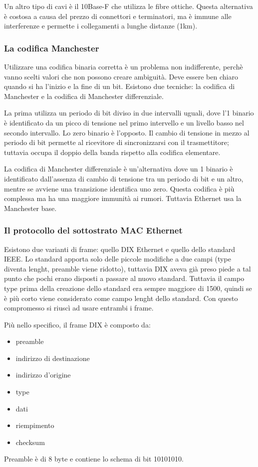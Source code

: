 Un altro tipo di cavi è il 10Base-F che utilizza le fibre ottiche.
Questa alternativa è costosa a causa del prezzo di connettori e terminatori, ma è immune alle interferenze e permette i collegamenti a lunghe distanze (1km).

\subsubsection{La codifica Manchester}
Utilizzare una codifica binaria corretta è un problema non indifferente, perchè vanno scelti valori che non possono creare ambiguità.
Deve essere ben chiaro quando si ha l'inizio e la fine di un bit.
Esistono due tecniche: la codifica di Manchester e la codifica di Manchester differenziale.

La prima utilizza un periodo di bit diviso in due intervalli uguali, dove l'1 binario è identificato da un picco di tensione nel primo intervello e un livello basso nel secondo intervallo.
Lo zero binario è l'opposto.
Il cambio di tensione in mezzo al periodo di bit permette al ricevitore di sincronizzarsi con il trasmettitore;
tuttavia occupa il doppio della banda rispetto alla codifica elementare.

La codifica di Manchester differenziale è un'alternativa dove un 1 binario è identificato dall'assenza di cambio di tensione tra un periodo di bit e un altro,
mentre se avviene una transizione identifica uno zero.
Questa codifica è più complessa ma ha una maggiore immunità ai rumori.
Tuttavia Ethernet usa la Manchester base.

\subsubsection{Il protocollo del sottostrato MAC Ethernet}
Esistono due varianti di frame: quello DIX Ethernet e quello dello standard IEEE.
Lo standard apporta solo delle piccole modifiche a due campi (type diventa lenght, preamble viene ridotto),
tuttavia DIX aveva già preso piede a tal punto che pochi erano disposti a passare al nuovo standard.
Tuttavia il campo type prima della creazione dello standard era sempre maggiore di 1500,
quindi se è più corto viene considerato come campo lenght dello standard.
Con questo compromesso si riuscì ad usare entrambi i frame.

Più nello specifico, il frame DIX è composto da:
\begin{itemize}
    \item preamble
    \item indirizzo di destinazione
    \item indirizzo d'origine
    \item type
    \item dati
    \item riempimento
    \item checksum
\end{itemize}
Preamble è di 8 byte e contiene lo schema di bit 10101010.

